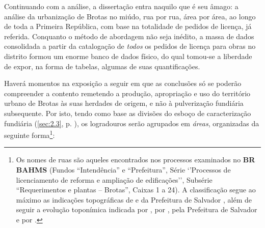 Continuando com a análise, a dissertação entra naquilo que é seu âmago: a análise da urbanização de Brotas no miúdo, rua por rua, área por área, ao longo de toda a Primeira República, com base na totalidade de pedidos de licença, já referida. Conquanto o método de abordagem não seja inédito, a massa de dados consolidada a partir da catalogação de \textit{todos} os pedidos de licença para obras no distrito formou um enorme banco de dados físico, do qual tomou-se a liberdade de expor, na forma de tabelas, algumas de suas quantificações. 

Haverá momentos na exposição a seguir em que as conclusões só se poderão compreender a contento remetendo a produção, apropriação e uso do território urbano de Brotas às suas herdades de origem, e não à pulverização fundiária subsequente. Por isto, tendo como base as divisões do esboço de caracterização fundiária (\autoref{sec:2.3}, p. \pageref{sec:2.3}), os logradouros serão agrupados em \textit{áreas}, organizadas da seguinte forma\footnote{Os nomes de ruas são aqueles encontrados nos processos examinados no \textbf{BR BAHMS} (Fundos ``Intendência'' e ``Prefeitura'', Série `'Processos de licenciamento de reforma e ampliação de edificações'', Subsérie ``Requerimentos e plantas -- Brotas'', Caixas 1 a 24). A classificação segue ao máximo as indicações topográficas de  e da Prefeitura de Salvador \cite{municipal_atlas_1955}, além de seguir a evolução toponímica indicada por , por , pela Prefeitura de Salvador \citeyear{municipal_atlas_1955} e por .}:

